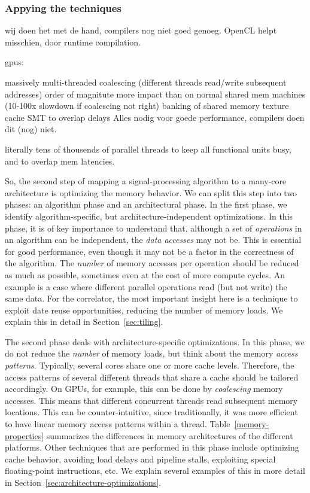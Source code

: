 \documentclass{article}
\begin{document}
\subsubsection{Appying the techniques}


wij doen het met de hand, compilers nog niet goed genoeg. OpenCL helpt misschien, door runtime compilation.

gpus:

massively multi-threaded
coalescing (different threads read/write subsequent addresses)
order of magnitute more impact than on normal shared mem machines (10-100x slowdown if coalescing not right)
banking of shared memory
texture cache
SMT to overlap delays
Alles nodig voor goede performance, compilers doen dit (nog) niet.


literally tens of thousends of parallel threads to keep all functional units busy, and to overlap mem latencies.

So, the second step of mapping a signal-processing algorithm to a many-core architecture
is optimizing the memory behavior. We can split this step into two phases:
an algorithm phase and an architectural phase.
In the first phase, we identify algorithm-specific, but
architecture-independent optimizations. 
In this phase, it is of key importance to understand that, although a
set of \emph{operations} in an algorithm can be independent, the \emph{data
  accesses} may not be.  This is essential for good performance, even though it may not be a
factor in the correctness of the algorithm. The \emph{number} of memory accesses per operation should
be reduced as much as possible, sometimes even at the cost of more
compute cycles. An example is a case
where different parallel operations read (but not write) the
same data.  For the correlator, the most important insight here
is a technique to exploit date reuse opportunities, reducing the number of memory
loads. We explain this in detail in Section~\ref{sec:tiling}.

The second phase deals with architecture-specific optimizations.
In this phase, we do not reduce the \emph{number} of memory loads, but think about the
memory \emph{access patterns}. Typically, several cores share one or
more cache levels. Therefore, the access patterns of several different
threads that share a cache should be tailored accordingly. On GPUs,
for example, this can be done by \emph{coalescing} memory accesses.
This means that different concurrent threads read subsequent memory
locations.  This can be counter-intuitive, since traditionally, it was
more efficient to have linear memory access patterns within a
thread. Table~\ref{memory-properties} summarizes the differences in
memory architectures of the different platforms.
Other techniques that are performed in this phase include optimizing cache
behavior, avoiding load delays and pipeline stalls, exploiting special floating-point instructions, etc.
We explain several examples of this in more detail in Section~\ref{sec:architecture-optimizations}.
\end{document}
